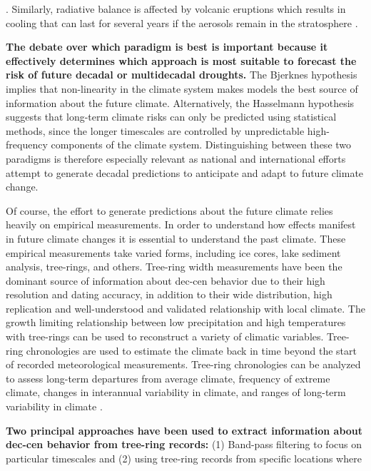 \documentclass[phd,tocprelim]{cornell}
\begin{document}
\cite{emile2007nino,meehl2009amplifying,anchukaitis2012tree}. 
Similarly, radiative balance is affected by volcanic eruptions
which results in cooling \cite{robock2005cooling,mann2007climate} 
that can last for several years if the aerosols remain 
in the stratosphere \cite{solomon2011decadal,vernier2011major}.
\par
\textbf{The debate over which paradigm is best is important 
because it effectively determines which approach 
is most suitable to forecast the risk of future decadal or 
multidecadal droughts.} The Bjerknes hypothesis implies that
non-linearity in the climate system makes models the best source 
of information about the future climate. Alternatively, the 
Hasselmann hypothesis suggests that long-term climate risks 
can only be predicted using statistical methods, since the 
longer timescales are controlled by unpredictable high-frequency 
components of the climate system. Distinguishing between 
these two paradigms is therefore especially relevant as 
national and international efforts attempt to generate decadal 
predictions to anticipate and adapt to future climate change.
\par
Of course, the effort to generate predictions about the future 
climate relies heavily on empirical measurements. In order to 
understand how effects manifest in future climate changes it is 
essential to understand the past climate. These empirical 
measurements take varied forms, including ice cores, lake sediment 
analysis, tree-rings, and others. Tree-ring width measurements 
have been the dominant source of information about dec-cen 
behavior due to their high resolution and dating accuracy, in 
addition to their wide distribution, high replication and 
well-understood and validated relationship with local climate. 
The growth limiting relationship between low precipitation and 
high temperatures with tree-rings can be used to reconstruct a 
variety of climatic variables. Tree-ring chronologies are used to 
estimate the climate back in time beyond the start of recorded 
meteorological measurements. Tree-ring chronologies can be analyzed to 
assess long-term departures from average climate, frequency of 
extreme climate, changes in interannual variability in climate, 
and ranges of long-term variability in climate 
\cite{sheppard2010dendroclimatology}. 
\par
\textbf{Two principal approaches have been used to extract 
information about dec-cen behavior from tree-ring records:} 
(1) Band-pass filtering to focus on particular timescales and 
(2) using tree-ring records from specific locations where 
\end{document}
